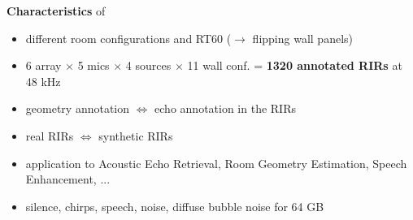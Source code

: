 \begin{frame}[t]{\dechorate  \hfill\faPaintBrush}
    \vspace{2mm}
    \begin{mycontriblock}{\textbf{Characteristics} of \dechorate}
        \begin{itemize}\small
            \item different room configurations and RT60 ($\to$ flipping wall panels)
            \item 6 array $\times$ 5 mics $\times$ 4 sources $\times$ 11 wall conf. = \textbf{1320 annotated RIRs} at 48 kHz
            \item geometry annotation $\Leftrightarrow$ echo annotation in the RIRs
            \item real RIRs $\Leftrightarrow$ synthetic RIRs
            \item application to  Acoustic Echo Retrieval, Room Geometry Estimation, Speech Enhancement, ...
            \item silence, chirps, speech, noise, diffuse bubble noise for 64 GB
        \end{itemize}
    \hfill {\small {}}
    \end{mycontriblock}


\end{frame}
